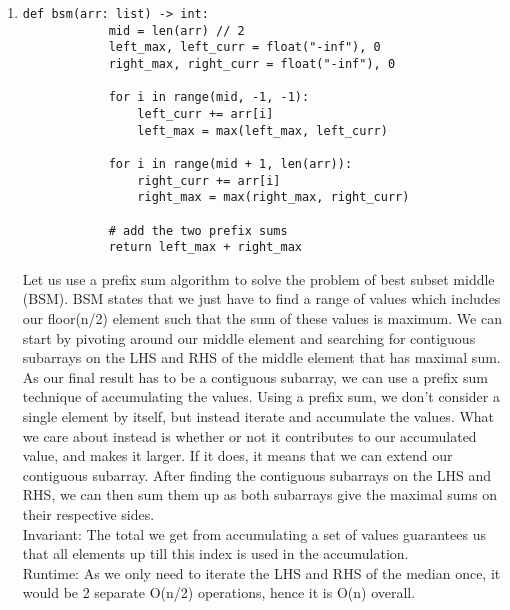 \documentclass[12pt,letterpaper]{article}
\begin{document}
\begin{enumerate}
    \item 
    \begin{lstlisting}[style = Python]
        def bsm(arr: list) -> int:
            mid = len(arr) // 2
            left_max, left_curr = float("-inf"), 0
            right_max, right_curr = float("-inf"), 0
            
            for i in range(mid, -1, -1):
                left_curr += arr[i]
                left_max = max(left_max, left_curr)
            
            for i in range(mid + 1, len(arr)):
                right_curr += arr[i]
                right_max = max(right_max, right_curr)

            # add the two prefix sums
            return left_max + right_max
    \end{lstlisting}
    
    Let us use a prefix sum algorithm to solve the problem of best subset middle (BSM). 
    BSM states that we just have to find a range of values which includes our floor(n/2) element 
    such that the sum of these values is maximum.
    We can start by pivoting around our middle element and
    searching for contiguous subarrays on the LHS and RHS of the middle element that has maximal sum.
    As our final result has to be a contiguous subarray, 
    we can use a prefix sum technique of accumulating the values. 
    Using a prefix sum, we don't consider a single element by itself, 
    but instead iterate and accumulate the values.
    What we care about instead is whether or not it contributes to our accumulated value, and makes it larger.
    If it does, it means that we can extend our contiguous subarray.
    After finding the contiguous subarrays on the LHS and RHS, 
    we can then sum them up as both subarrays give the maximal sums on their respective sides. \\
    
    Invariant: 
    The total we get from accumulating a set of values 
    guarantees us that all elements up till this index is used in the accumulation. \\

    Runtime: 
    As we only need to iterate the LHS and RHS of the median once, it would be 2 separate O(n/2) operations, hence it is O(n) overall.

    \newpage
    

\end{enumerate}
\end{document}
